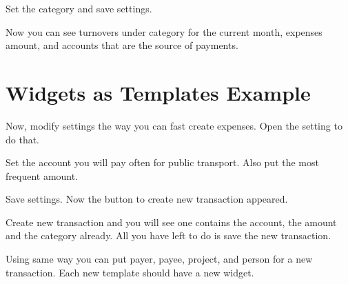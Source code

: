 \documentclass[a4paper,10pt,english]{sphinxmanual}
\begin{document}
\sphinxAtStartPar
Set the  category and save settings.

\noindent{}

\sphinxAtStartPar
Now you can see turnovers under  category for the current month,
expenses amount, and accounts that are the source of payments.


\section{Widgets as Templates Example}
\label{\detokenize{widgets:widgets-as-templates-example}}
\sphinxAtStartPar
Now, modify settings the way you can fast create expenses. Open the setting to do that.

\noindent{}

\noindent{}

\noindent{}

\sphinxAtStartPar
Set the account you will pay often for public transport. Also put the most frequent amount.

\noindent{}

\noindent{}

\noindent{}

\sphinxAtStartPar
Save settings. Now the button to create new transaction appeared.

\noindent{}

\sphinxAtStartPar
Create new transaction and you will see one contains the account, the amount and the category already.
All you have left to do is save the new transaction.

\sphinxAtStartPar
Using same way you can put payer, payee, project, and person for a new transaction. Each new
template should have a new widget.

\sphinxstepscope
\end{document}
